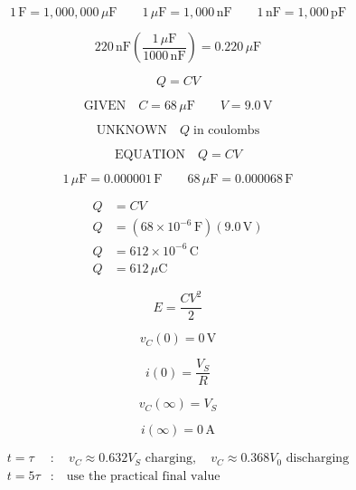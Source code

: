 \documentclass{article}
\begin{document}
\color{SlideNavy}

\begin{preview}\[1\,\mathrm{F}=1{,}000{,}000\,\mu\mathrm{F}\qquad 1\,\mu\mathrm{F}=1{,}000\,\mathrm{nF}\qquad 1\,\mathrm{nF}=1{,}000\,\mathrm{pF}\]\end{preview}
\begin{preview}\[220\,\mathrm{nF}\left(\frac{1\,\mu\mathrm{F}}{1000\,\mathrm{nF}}\right)=0.220\,\mu\mathrm{F}\]\end{preview}
\begin{preview}\[Q=CV\]\end{preview}
\begin{preview}\[\text{GIVEN}\quad C=68\,\mu\mathrm{F}\qquad V=9.0\,\mathrm{V}\]\end{preview}
\begin{preview}\[\text{UNKNOWN}\quad Q\;\text{in coulombs}\]\end{preview}
\begin{preview}\[\text{EQUATION}\quad Q=CV\]\end{preview}
\begin{preview}\[1\,\mu\mathrm{F}=0.000001\,\mathrm{F}\qquad 68\,\mu\mathrm{F}=0.000068\,\mathrm{F}\]\end{preview}
\begin{preview}\[\begin{aligned}Q&=CV\\Q&=(68\times10^{-6}\,\mathrm{F})(9.0\,\mathrm{V})\\Q&=612\times10^{-6}\,\mathrm{C}\\Q&=612\,\mu\mathrm{C}\end{aligned}\]\end{preview}
\begin{preview}\[E=\frac{CV^2}{2}\]\end{preview}
\begin{preview}\[v_C(0)=0\,\mathrm{V}\]\end{preview}
\begin{preview}\[i(0)=\frac{V_S}{R}\]\end{preview}
\begin{preview}\[v_C(\infty)=V_S\]\end{preview}
\begin{preview}\[i(\infty)=0\,\mathrm{A}\]\end{preview}
\begin{preview}\[\begin{aligned}t=\tau &: \quad v_C\approx0.632V_S\text{ charging},\quad v_C\approx0.368V_0\text{ discharging}\\t=5\tau &: \quad \text{use the practical final value}\end{aligned}\]\end{preview}
\end{document}
